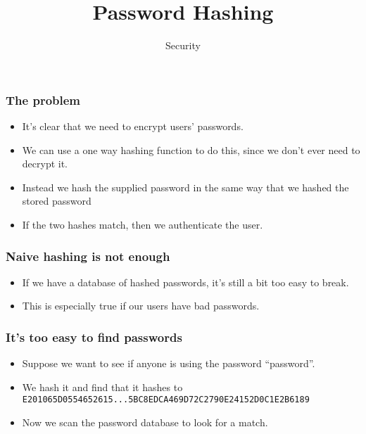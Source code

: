 \documentclass[10pt]{beamer}
\title{Password Hashing}
\author[IN618]{Security}
\institute[Otago Polytechnic]{
  Otago Polytechnic \\
  Dunedin, New Zealand \\
}
\date{}
\begin{document}
\begin{frame}[plain]
  \titlepage
\end{frame}


\begin{frame}
	\frametitle{The problem}
	\begin{itemize}
		\item It's clear that we need to encrypt users' passwords.
		\item We can use a one way hashing function to do this, since we don't ever need to decrypt it.
		\item Instead we hash the supplied password in the same way that we hashed the stored password
		\item If the two hashes match, then we authenticate the user.
	\end{itemize}

\end{frame}

\begin{frame}
	\frametitle{Naive hashing is not enough}
	\begin{itemize}
		\item If we have a database of hashed passwords, it's still 
			a bit too easy to break.
		\item This is especially true if our users have bad passwords.
	\end{itemize}
\end{frame}

\begin{frame}
	\frametitle{It's too easy to find passwords}
	\begin{itemize}
		\item Suppose we want to see if anyone is using the 
			password ``password''.
		\item We hash it and find that it hashes to \\
			\texttt{E201065D0554652615...5BC8EDCA469D72C2790E24152D0C1E2B6189}
		\item Now we scan the password database to look for a match.
	\end{itemize}
\end{frame}
\end{document}
